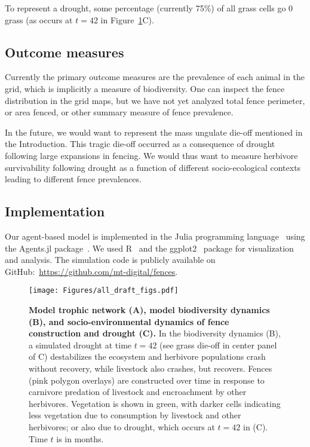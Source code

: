 \documentclass{article}
\begin{document}
To represent a drought, some percentage (currently 75\%) of all grass cells go
0 grass (as occurs at $t=42$ in Figure~\ref{fig:composition}C).


\subsection{Outcome measures}

Currently the primary outcome measures are the prevalence of each animal in the
grid, which is implicitly a measure of biodiversity. One can inspect the fence
distribution in the grid maps, but we have not yet analyzed total fence
perimeter, or area fenced, or other summary measure of fence prevalence. 

In the future, we would want to represent the mass ungulate die-off mentioned
in the Introduction. This tragic die-off occurred as a consequence of drought
following large expansions in fencing. We would thus want to measure herbivore
survivability following drought as a function of different socio-ecological 
contexts leading to different fence prevalences.


\subsection{Implementation}

Our agent-based model is implemented in the Julia programming 
language~\cite{Perkel2019} using the Agents.jl package~\cite{Datseris2022}. 
We used R~\cite{RLang} and the ggplot2~\cite{Wickham2016} package for
visualization and analysis. The simulation code is publicly available on
GitHub:~\url{https://github.com/mt-digital/fences}.


\begin{figure}[h]
  \caption{\textbf{Model trophic network (A),
      model biodiversity dynamics (B), and socio-environmental dynamics of 
    fence construction and drought (C).} In the biodiversity dynamics (B), a
    simulated drought at time $t=42$ (see grass die-off in center panel of C)
    destabilizes the ecosystem and herbivore populations crash without
    recovery, while livestock also crashes, but recovers.  Fences (pink polygon
    overlays) are constructed over time in response to carnivore predation of
    livestock and encroachment by other herbivores. Vegetation is shown in
    green, with darker cells indicating less vegetation due to consumption by
    livestock and other herbivores; or also due to drought, which occurs at
    $t=42$ in (C). Time $t$ is in months. 
}
  \centering
  \texttt{[image: Figures/all\_draft\_figs.pdf]}
  \label{fig:composition}
\end{figure}
\end{document}
